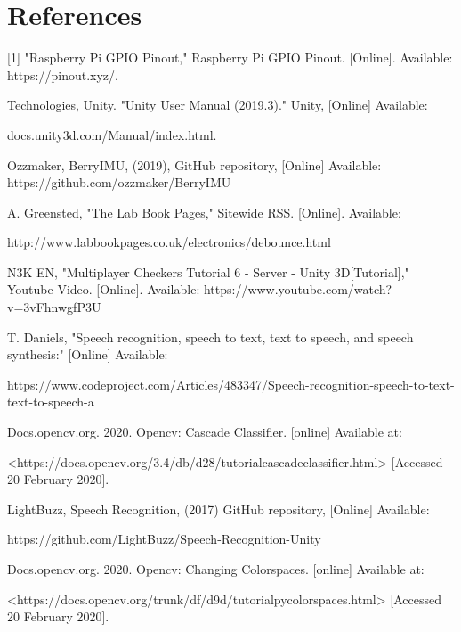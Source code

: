 \documentclass[a4paper,10pt]{article}
\begin{document}
\section{References}
[1] "Raspberry Pi GPIO Pinout," Raspberry Pi GPIO Pinout. [Online]. Available: https://pinout.xyz/. 

\noindent
[2] Technologies, Unity. "Unity User Manual (2019.3)." Unity, [Online] Available: 

\noindent
docs.unity3d.com/Manual/index.html. 

\noindent
[3]  Ozzmaker, BerryIMU, (2019), GitHub repository, [Online] Available: https://github.com/ozzmaker/BerryIMU

\noindent
[4] A. Greensted, "The Lab Book Pages," Sitewide RSS. [Online]. Available:

\noindent
http://www.labbookpages.co.uk/electronics/debounce.html

\noindent
[5] N3K EN, "Multiplayer Checkers Tutorial 6 - Server - Unity 3D[Tutorial]," Youtube Video. [Online]. Available: https://www.youtube.com/watch?v=3vFhnwgfP3U 

\noindent
[6] T. Daniels, "Speech recognition, speech to text, text to speech, and speech synthesis:" [Online] Available:

\noindent
https://www.codeproject.com/Articles/483347/Speech-recognition-speech-to-text-text-to-speech-a 

\noindent
[7] Docs.opencv.org. 2020. Opencv: Cascade Classifier. [online] Available at: 

\noindent
<https://docs.opencv.org/3.4/db/d28/tutorial\textunderscore cascade\textunderscore classifier.html> [Accessed 20 February 2020].

\noindent
[8] LightBuzz, Speech Recognition, (2017) GitHub repository, [Online] Available: 

\noindent
https://github.com/LightBuzz/Speech-Recognition-Unity

\noindent
[9] Docs.opencv.org. 2020. Opencv: Changing Colorspaces. [online] Available at:

\noindent
 <https://docs.opencv.org/trunk/df/d9d/tutorial\textunderscore py\textunderscore colorspaces.html> [Accessed 20 February 2020].
\end{document}

